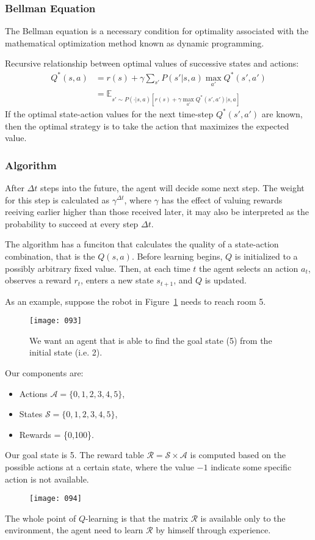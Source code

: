 \subsubsection{Bellman Equation}
The Bellman equation  is a necessary condition for optimality associated with the mathematical optimization method known as dynamic programming.

Recursive relationship between optimal values of successive states and actions:
\begin{align}
    Q^* (s,a) &= r(s) + \gamma \sum_{s'} P(s' | s,a) \max_{a'} Q^* (s',a')\\
    &= \mathbb{E}_{s' \sim P(\cdot | s,a) [ r(s) + \gamma \max_{a'} Q^* (s',a') | s,a]}
\end{align}
If the optimal state-action values for the next time-step \(Q^*(s',a')\) are known, then the optimal strategy is to take the action that maximizes the expected value.

\subsubsection{Algorithm}
After \(\Delta t\) steps into the future, the agent will decide some next step. The weight for this step is calculated as \(\gamma^{\Delta t}\), where \(\gamma\) has the effect of valuing rewards reeiving earlier higher than those received later, it may also be interpreted as the probability to succeed at every step \(\Delta t\).

The algorithm has a funciton that calculates the quality of a state-action combination, that is the \(Q (s,a)\). Before learning begins, \(Q\) is initialized to a possibly arbitrary fixed value. Then, at each time \(t\) the agent selects an action \(a_t\), observes a reward \(r_t\), enters a new state \(s_{t+1}\), and \(Q\) is updated.

As an example, suppose the robot in Figure~\ref{fig:093} needs to reach room 5.
\begin{figure}[h!]
    \centering
    \texttt{[image: 093]}
    \caption{We want an agent that is able to find the goal state (5) from the initial state (i.e. 2).}
    \label{fig:093}
\end{figure}
Our components are:
\begin{itemize}
    \item Actions \(\mathcal{A} = \{0,1,2,3,4,5\}\),
    \item States \(\mathcal{S} = \{0,1,2,3,4,5\}\),
    \item Rewards = \{0,100\}.
\end{itemize}
Our goal state is 5. The reward table \(\mathcal{R} = \mathcal{S} \times \mathcal{A}\) is computed based on the possible actions at a certain state, where the value \(-1\) indicate some specific action is not available.
\begin{figure}[h!]
    \centering
    \texttt{[image: 094]}
    \caption{}
    \label{fig:094}
\end{figure}
The whole point of \(Q\)-learning is that the matrix \(\mathcal{R}\) is available only to the environment, the agent need to learn \(\mathcal{R}\) by himself through experience.

